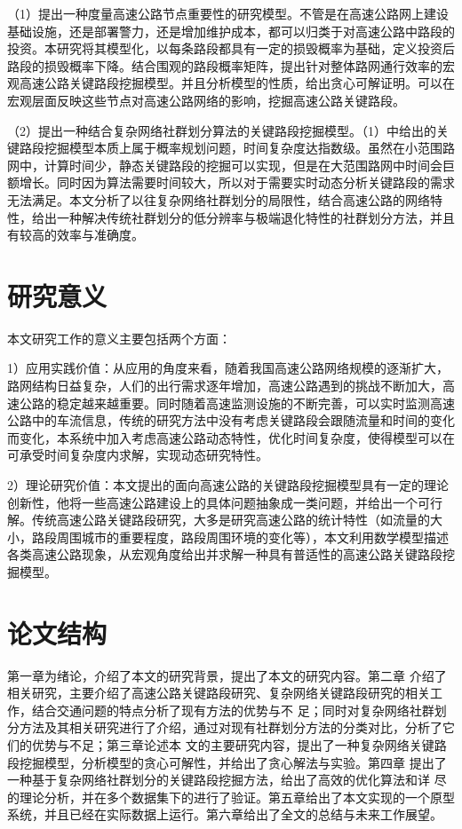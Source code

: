 		（1）提出一种度量高速公路节点重要性的研究模型。不管是在高速公路网上建设基础设施，还是部署警力，还是增加维护成本，都可以归类于对高速公路中路段的投资。本研究将其模型化，以每条路段都具有一定的损毁概率为基础，定义投资后路段的损毁概率下降。结合围观的路段概率矩阵，提出针对整体路网通行效率的宏观高速公路关键路段挖掘模型。并且分析模型的性质，给出贪心可解证明。可以在宏观层面反映这些节点对高速公路网络的影响，挖掘高速公路关键路段。
		
		（2）提出一种结合复杂网络社群划分算法的关键路段挖掘模型。（1）中给出的关键路段挖掘模型本质上属于概率规划问题，时间复杂度达指数级。虽然在小范围路网中，计算时间少，静态关键路段的挖掘可以实现，但是在大范围路网中时间会巨额增长。同时因为算法需要时间较大，所以对于需要实时动态分析关键路段的需求无法满足。本文分析了以往复杂网络社群划分的局限性，结合高速公路的网络特性，给出一种解决传统社群划分的低分辨率与极端退化特性的社群划分方法，并且有较高的效率与准确度。

\section{研究意义}
	本文研究工作的意义主要包括两个方面：

		1）应用实践价值：从应用的角度来看，随着我国高速公路网络规模的逐渐扩大，路网结构日益复杂，人们的出行需求逐年增加，高速公路遇到的挑战不断加大，高速公路的稳定越来越重要。同时随着高速监测设施的不断完善，可以实时监测高速公路中的车流信息，传统的研究方法中没有考虑关键路段会跟随流量和时间的变化而变化，本系统中加入考虑高速公路动态特性，优化时间复杂度，使得模型可以在可承受时间复杂度内求解，实现动态研究特性。

		2）理论研究价值：本文提出的面向高速公路的关键路段挖掘模型具有一定的理论创新性，他将一些高速公路建设上的具体问题抽象成一类问题，并给出一个可行解。传统高速公路关键路段研究，大多是研究高速公路的统计特性（如流量的大小，路段周围城市的重要程度，路段周围环境的变化等），本文利用数学模型描述各类高速公路现象，从宏观角度给出并求解一种具有普适性的高速公路关键路段挖掘模型。
		
\section{论文结构}
    第一章为绪论，介绍了本文的研究背景，提出了本文的研究内容。第二章
介绍了相关研究，主要介绍了高速公路关键路段研究、复杂网络关键路段研究的相关工作，结合交通问题的特点分析了现有方法的优势与不
足；同时对复杂网络社群划分方法及其相关研究进行了介绍，通过对现有社群划分方法的分类对比，分析了它们的优势与不足；第三章论述本
文的主要研究内容，提出了一种复杂网络关键路段挖掘模型，分析模型的贪心可解性，并给出了贪心解法与实验。第四章
提出了一种基于复杂网络社群划分的关键路段挖掘方法，给出了高效的优化算法和详
尽的理论分析，并在多个数据集下的进行了验证。第五章给出了本文实现的一个原型系统，并且已经在实际数据上运行。第六章给出了全文的总结与未来工作展望。


